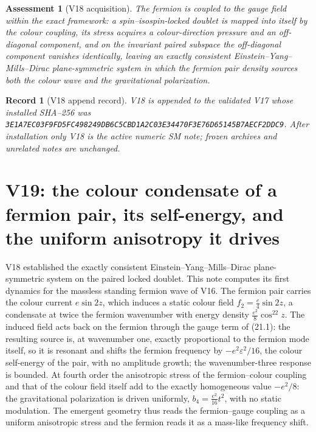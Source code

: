 \documentclass[11pt]{article}
\newtheorem{assessment}[theorem]{Assessment}
\newtheorem{record}[theorem]{Record}
\theoremstyle{remark}
\begin{document}
\begin{assessment}[V18 acquisition]
\label{ass:v20v18}
The fermion is coupled to the gauge field within the exact framework:
a spin--isospin-locked doublet is mapped into itself by the colour
coupling, its stress acquires a colour-direction pressure and an
off-diagonal component, and on the invariant paired subspace the
off-diagonal component vanishes identically, leaving an exactly
consistent Einstein--Yang--Mills--Dirac plane-symmetric system in
which the fermion pair density sources both the colour wave and the
gravitational polarization.
\end{assessment}

\begin{record}[V18 append record]
\label{rec:v20v18}
V18 is appended to the validated V17 whose installed SHA--256 was
\texttt{3E1A7EC03F9FD5FC498249DB6C5CBD1A2C03E34470F3E76D65145B7AECF2DDC9}.
After installation only V18 is the active numeric SM note; frozen
archives and unrelated notes are unchanged.
\end{record}


\section{V19: the colour condensate of a fermion pair, its self-energy, and the uniform anisotropy it drives}
\label{sec:v20v19}

V18 established the exactly consistent Einstein--Yang--Mills--Dirac
plane-symmetric system on the paired locked doublet.  This note
computes its first dynamics for the massless standing fermion wave
of V16.  The fermion pair carries the colour current \(e\sin2z\),
which induces a static colour field \(f_2=\tfrac e4\sin2z\), a
condensate at twice the fermion wavenumber with energy density
\(\tfrac{e^2}8\cos^22z\).  The induced field acts back on the fermion
through the gauge term of (21.1): the resulting source is, at
wavenumber one, exactly proportional to the fermion mode itself, so
it is resonant and shifts the fermion frequency by \(-e^2\varepsilon^2/16\),
the colour self-energy of the pair, with no amplitude growth; the
wavenumber-three response is bounded.  At fourth order the
anisotropic stress of the fermion--colour coupling and that of the
colour field itself add to the exactly homogeneous value \(-e^2/8\):
the gravitational polarization is driven uniformly,
\(b_4=\tfrac{e^2}{16}t^2\), with no static modulation.  The emergent
geometry thus reads the fermion--gauge coupling as a uniform
anisotropic stress and the fermion reads it as a mass-like frequency
shift.
\end{document}
